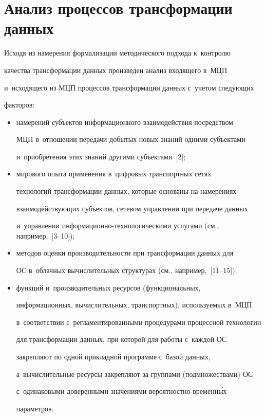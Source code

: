 \section{Анализ процессов трансформации данных}

  

  Исходя из намерения формализации методического подхода к~контролю 

качества трансформации данных произведен анализ входящего в~МЦП 

и~исходящего из МЦП процессов трансформации данных с~учетом сле\-ду\-ющих 

факторов: 

  \begin{itemize}

\item намерений субъектов информационного взаимодействия по\-средст\-вом 

МЦП в~отношении передачи добытых новых знаний одними субъектами 

и~приобретения этих знаний другими субъектами~[2]; 

\item мирового опыта применения в~циф\-ро\-вых транспортных сетях 

технологий трансформации данных, которые основаны на намерениях 

вза\-и\-мо\-дей\-ст\-ву\-ющих субъектов, сетевом управ\-ле\-нии при передаче данных 

и~управ\-ле\-нии ин\-фор\-ма\-ци\-он\-но-тех\-но\-ло\-ги\-че\-ски\-ми услугами (см., например,~[3--10]);

\item методов оценки производительности при трансформации данных для 

ОС в~облачных вы\-чис\-ли\-тель\-ных структурах (см., например,~[11--15]);

\item функций и~производительных ресурсов (функциональных, 

информационных, вы\-чис\-ли\-тель\-ных, транспортных), ис\-поль\-зу\-емых в~МЦП 

в~соответствии с~регламентированными процедурами процессной технологии 

для трансформации данных, при которой для работы с~каж\-дой ОС 

за\-креп\-ля\-ют по одной при\-клад\-ной программе с~базой данных, 

а~вы\-чис\-ли\-тель\-ные ресурсы за\-креп\-ля\-ют за группами (подмножествами) ОС 

с~одинаковыми доверенными значениями ве\-ро\-ят\-ност\-но-вре\-мен\-н\'{ы}х  

па\-ра\-мет\-ров. 

\end{itemize}

